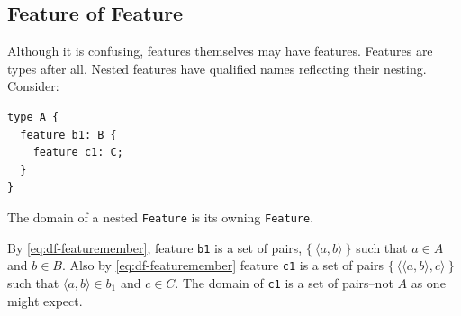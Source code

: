 %

\subsection{Feature of Feature}  

\pn Although it is confusing, features themselves may have features.  Features are types after all.  Nested features have qualified names reflecting their nesting.
Consider:
\begin{lstlisting}
type A { 
  feature b1: B {
    feature c1: C; 
  }
}
\end{lstlisting}

\pn The domain of a nested \texttt{Feature} is its owning \texttt{Feature}.

\pn By \ref{eq:df-featuremember}, feature \texttt{b1} is a set of pairs, $\{~\langle a,b\rangle~\}$ such that $a \in A$ and $b \in B$.
Also by \ref{eq:df-featuremember} feature \texttt{c1} is a set of pairs $\{~\langle \langle a,b \rangle, c\rangle~\}$ such that $\langle a,b\rangle\in b_1$ and $c\in C$.
The domain of \texttt{c1} is a set of pairs--not $A$ as one might expect.





